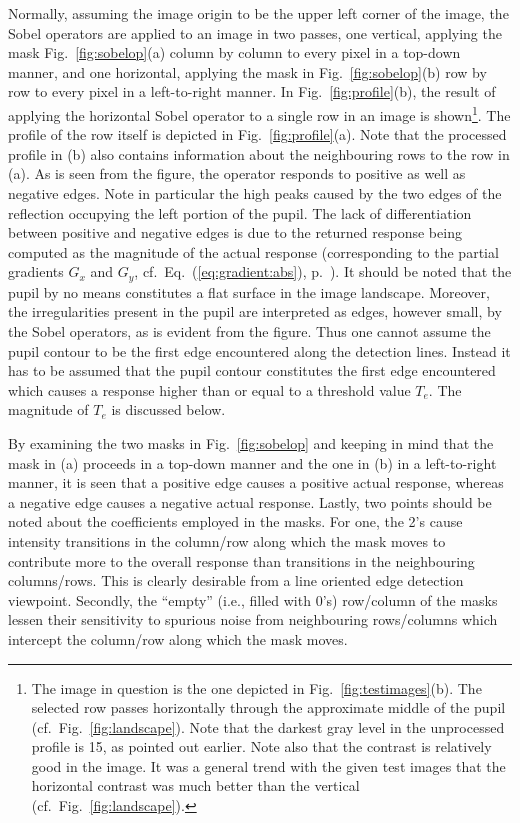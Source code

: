 Normally, assuming the image origin to be the upper left corner of the
image, the Sobel operators are applied to an image in two passes, one
vertical, applying the mask Fig.~\ref{fig:sobelop}(a) column by column
to every pixel in a top-down manner, and one horizontal, applying the
mask in Fig.~\ref{fig:sobelop}(b) row by row to every pixel in a
left-to-right manner.  In Fig.~\ref{fig:profile}(b), the result of
applying the horizontal Sobel operator to a single row in an image is
shown\footnote{The image in question is the one depicted in
  Fig.~\ref{fig:testimages}(b).  The selected row passes horizontally
  through the approximate middle of the pupil (cf.\ 
  Fig.~\ref{fig:landscape}).  Note that the darkest gray level in the
  unprocessed profile is 15, as pointed out earlier.  Note also that
  the contrast is relatively good in the image.  It was a general
  trend with the given test images that the horizontal contrast was
  much better than the vertical (cf.\ Fig.~\ref{fig:landscape}).}.
The profile of the row itself is depicted in
Fig.~\ref{fig:profile}(a).  Note that the processed profile in (b)
also contains information about the neighbouring rows to the row in
(a).  As is seen from the figure, the operator responds to positive as
well as negative edges.  Note in particular the high peaks caused by
the two edges of the reflection occupying the left portion of the
pupil.  The lack of differentiation between positive and negative
edges is due to the returned response being computed as the magnitude
of the actual response (corresponding to the partial gradients $G_{x}$
and $G_{y}$, cf.\ Eq.~(\ref{eq:gradient:abs}),
p.~\pageref{eq:gradient:abs}).  It should be noted that the pupil by
no means constitutes a flat surface in the image landscape.  Moreover,
the irregularities present in the pupil are interpreted as edges,
however small, by the Sobel operators, as is evident from the figure.
Thus one cannot assume the pupil contour to be the first edge
encountered along the detection lines.  Instead it has to be assumed
that the pupil contour constitutes the first edge encountered which
causes a response higher than or equal to a threshold value $T_{e}$.
The magnitude of $T_{e}$ is discussed below.

By examining the two masks in Fig.~\ref{fig:sobelop} and keeping in
mind that the mask in (a) proceeds in a top-down manner and the one in
(b) in a left-to-right manner, it is seen that a positive edge causes
a positive actual response, whereas a negative edge causes a negative
actual response.  Lastly, two points should be noted about the
coefficients employed in the masks.  For one, the 2's cause intensity
transitions in the column/row along which the mask moves to contribute
more to the overall response than transitions in the neighbouring
columns/rows.  This is clearly desirable from a line oriented edge
detection viewpoint.  Secondly, the ``empty'' (i.e., filled with 0's)
row/column of the masks lessen their sensitivity to spurious noise
from neighbouring rows/columns which intercept the column/row along
which the mask moves.


